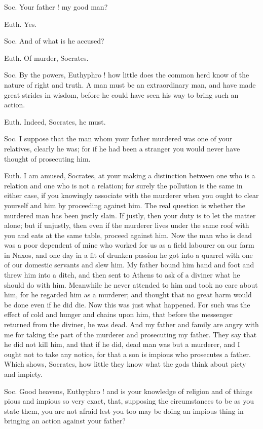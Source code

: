 Soc. Your father ! my good man?

Euth. Yes.

Soc. And of what is he accused?

Euth. Of murder, Socrates.

Soc. By the powers, Euthyphro ! how little does the common herd know of the nature of right and truth. A man must be an extraordinary man, and have made great strides in wisdom, before he could have seen his way to bring such an action.

Euth. Indeed, Socrates, he must.

Soc. I suppose that the man whom your father murdered was one of your relatives, clearly he was; for if he had been a stranger you would never have thought of prosecuting him.

Euth. I am amused, Socrates, at your making a distinction between one who is a relation and one who is not a relation; for surely the pollution is the same in either case, if you knowingly associate with the murderer when you ought to clear yourself and him by proceeding against him. The real question is whether the murdered man has been justly slain. If justly, then your duty is to let the matter alone; but if unjustly, then even if the murderer lives under the same roof with you and eats at the same table, proceed against him. Now the man who is dead was a poor dependent of mine who worked for us as a field labourer on our farm in Naxos, and one day in a fit of drunken passion he got into a quarrel with one of our domestic servants and slew him. My father bound him hand and foot and threw him into a ditch, and then sent to Athens to ask of a diviner what he should do with him. Meanwhile he never attended to him and took no care about him, for he regarded him as a murderer; and thought that no great harm would be done even if he did die. Now this was just what happened. For such was the effect of cold and hunger and chains upon him, that before the messenger returned from the diviner, he was dead. And my father and family are angry with me for taking the part of the murderer and prosecuting my father. They say that he did not kill him, and that if he did, dead man was but a murderer, and I ought not to take any notice, for that a son is impious who prosecutes a father. Which shows, Socrates, how little they know what the gods think about piety and impiety.

Soc. Good heavens, Euthyphro ! and is your knowledge of religion and of things pious and impious so very exact, that, supposing the circumstances to be as you state them, you are not afraid lest you too may be doing an impious thing in bringing an action against your father?

